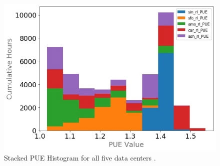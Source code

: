 \begin{figure}[!h]
  \centering
  \includegraphics[scale=0.4]{img/pue.jpg}
  \caption[Stacked PUE Histogram]{Stacked PUE Histogram for all five data centers .}
  \label{fig:stacked_pue}
  \end{figure}